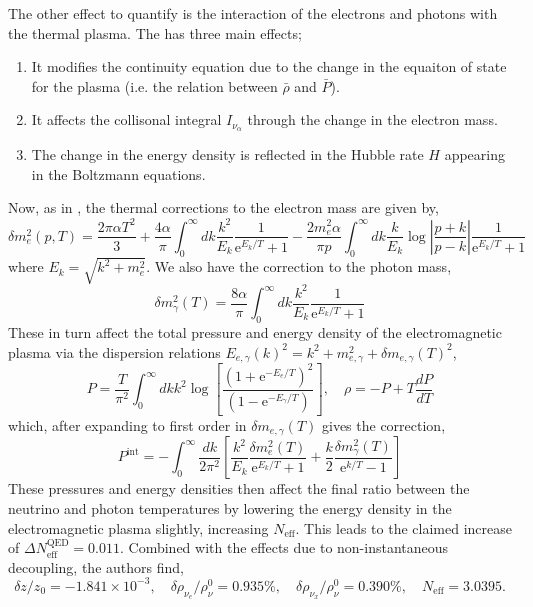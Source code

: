 \documentclass[11pt]{article}
\numberwithin{equation}{section}
\numberwithin{figure}{section}
\numberwithin{table}{section}
\begin{document}
The other effect to quantify is the interaction of the electrons and photons with the thermal plasma. The has three main effects;
\begin{enumerate}
\item It modifies the continuity equation due to the change in the equaiton of state for the plasma (i.e. the relation between $\bar{\rho}$ and $\bar{P}$).
\item It affects the collisonal integral $I_{\nu_\alpha}$ through the change in the electron mass.
\item The change in the energy density is reflected in the Hubble rate $H$ appearing in the Boltzmann equations.
\end{enumerate}
Now, as in \citet{Heckler:1994tv}, the thermal corrections to the electron mass are given by,
\begin{equation}
\delta m_{e}^{2}(p, T)=\frac{2 \pi \alpha T^{2}}{3}+\frac{4 \alpha}{\pi} \int_{0}^{\infty} d k \frac{k^{2}}{E_{k}} \frac{1}{\mathrm{e}^{E_{k} / T}+1} -\frac{2 m_{e}^{2} \alpha}{\pi p} \int_{0}^{\infty} d k \frac{k}{E_{k}} \log \left|\frac{p+k}{p-k}\right| \frac{1}{\mathrm{e}^{E_{k} / T}+1}
\end{equation}
where $E_k = \sqrt{k^2 + m_e^2}$. We also have the correction to the photon mass,
\begin{equation}
\delta m_{\gamma}^{2}(T)=\frac{8 \alpha}{\pi} \int_{0}^{\infty} d k \frac{k^{2}}{E_{k}} \frac{1}{\mathrm{e}^{E_{k} / T}+1}
\end{equation}
These in turn affect the total pressure and energy density of the electromagnetic plasma via the dispersion relations $E_{e, \gamma}(k)^2 = k^2 + m_{e, \gamma}^2 + \delta m_{e, \gamma}(T)^2$,
\begin{equation}
P=\frac{T}{\pi^{2}} \int_{0}^{\infty} d k k^{2} \log \left[\frac{\left(1+\mathrm{e}^{-E_{e} / T}\right)^{2}}{\left(1-\mathrm{e}^{-E_{\gamma} / T}\right)}\right], \quad \rho=-P+T \frac{d P}{d T}
\end{equation}
which, after expanding to first order in $\delta m_{e, \gamma}(T)$ gives the correction,
\begin{equation}
P^{\mathrm{int}}=-\int_{0}^{\infty} \frac{d k}{2 \pi^{2}}\left[\frac{k^{2}}{E_{k}} \frac{\delta m_{e}^{2}(T)}{\mathrm{e}^{E_{k} / T}+1}+\frac{k}{2} \frac{\delta m_{\gamma}^{2}(T)}{\mathrm{e}^{k / T}-1}\right]
\end{equation}
These pressures and energy densities then affect the final ratio between the neutrino and photon temperatures by lowering the energy density in the electromagnetic plasma slightly, increasing $N_{\mathrm{eff}}$. This leads to the claimed increase of $\Delta N^{\mathrm{QED}}_{\mathrm{eff}} = 0.011$. Combined with the effects due to non-instantaneous decoupling, the authors find,
\begin{equation}
\delta z/z_0 = -1.841 \times 10^{-3}, \quad \delta \rho_{\nu_e}/\rho_\nu^0 = 0.935\%, \quad \delta\rho_{\nu_x}/\rho_\nu^0 = 0.390\%, \quad N_{\mathrm{eff}} = 3.0395.
\end{equation}
\end{document}
